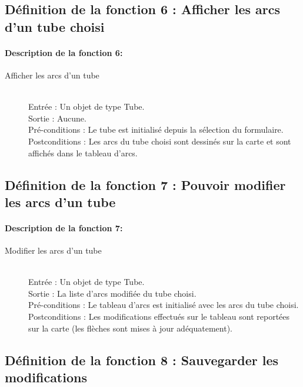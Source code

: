 \documentclass{polytech/polytech}
\numberwithin{figure}{chapter}
\begin{document}
\begin{appendix}
\subsection{Définition de la fonction 6 : Afficher les arcs d'un tube choisi}

\paragraph{Description de la fonction 6:}

\begin{description}
    \item[Afficher les arcs d'un tube] ~ \\
        Entrée : Un objet de type Tube.\\ 
        Sortie : Aucune.\\
        Pré-conditions : Le tube est initialisé depuis la sélection du formulaire.\\
        Postconditions : Les arcs du tube choisi sont dessinés sur la carte et sont affichés dans le tableau d'arcs.
\end{description}

\subsection{Définition de la fonction 7 : Pouvoir modifier les arcs d'un tube}

\paragraph{Description de la fonction 7:}

\begin{description}
    \item[Modifier les arcs d'un tube] ~ \\
        Entrée : Un objet de type Tube.\\ 
        Sortie : La liste d'arcs modifiée du tube choisi.\\
        Pré-conditions : Le tableau d'arcs est initialisé avec les arcs du tube choisi.\\
        Postconditions : Les modifications effectués sur le tableau sont reportées sur la carte (les flèches sont mises à jour adéquatement).
\end{description}

\subsection{Définition de la fonction 8 : Sauvegarder les modifications}


\end{appendix}
\end{document}
